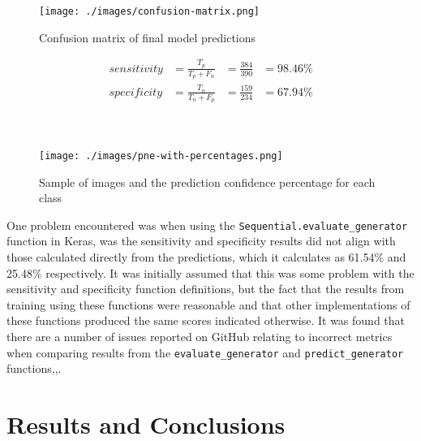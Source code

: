 \documentclass[12pt,a4paper,titlepage,twoside]{report}
\begin{document}
	\begin{minipage}[h]{\textwidth}
	\begin{minipage}{0.4\textwidth}
		\begin{figure}[H]
			\centering
			\texttt{[image: ./images/confusion-matrix.png]}
			\caption{Confusion matrix of final model predictions}
			\label{fig:confusion-matrix}
		\end{figure}
	\end{minipage}%
	\hspace{0.5cm}%
	\begin{minipage}{0.4\textwidth}
		\begin{align*}
			sensitivity &= \frac{T_p}{T_p + F_n} &= \frac{384}{390} &= 98.46\% \\
			specificity &= \frac{T_n}{T_n + F_p} &= \frac{159}{234} &= 67.94\% \\
		\end{align*}
	\end{minipage}	
	\end{minipage} \\

	\begin{figure}[t]
		\centering
		\texttt{[image: ./images/pne-with-percentages.png]}
		\caption{Sample of images and the prediction confidence percentage for each class}
		\label{fig:pne-w-percent}
	\end{figure}
	
	One problem encountered was when using the \texttt{Sequential.evaluate_generator} function in Keras, was the sensitivity and specificity results did not align with those calculated directly from the predictions, which it calculates as 61.54\% and 25.48\% respectively. It was initially assumed that this was some problem with the sensitivity and specificity function definitions, but the fact that the results from training using these functions were reasonable and that other implementations of these functions produced the same scores indicated otherwise. It was found that there are a number of issues reported on GitHub relating to incorrect metrics when comparing results from the \texttt{evaluate_generator} and \texttt{predict_generator} functions\cite{issue6499},\cite{issue3477},\cite{issue11754}.
	

\chapter{Results and Conclusions}
\end{document}
